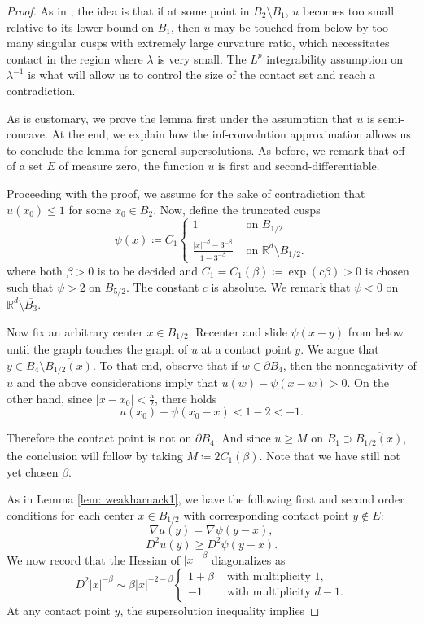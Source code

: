 \documentclass[reqno]{amsart}
\numberwithin{equation}{section}
\numberwithin{equation}{section}
\newcommand{\R}{\mathbb R}
\newcommand{\ds}{\displaystyle}
\newcounter{case}
\begin{document}
\begin{proof}
As in \cite{ArmstrongSmart2014}, the idea is that if at some point in $B_2\setminus B_1$, $u$ becomes too small relative to its lower bound on $B_1$, then $u$ may be touched from below by too many singular cusps with extremely large curvature ratio, which necessitates contact in the region where $\lambda$ is very small. The $L^p$ integrability assumption on $\lambda^{-1}$ is what will allow us to control the size of the contact set and reach a contradiction.

As is customary, we prove the lemma first under the assumption that $u$ is semi-concave. At the end, we explain how the inf-convolution approximation allows us to conclude the lemma for general supersolutions. As before, we remark that off of a set $E$ of measure zero, the function $u$ is first and second-differentiable.

Proceeding with the proof, we assume for the sake of contradiction that $u(x_0) \le 1$ for some $x_0 \in B_2$. Now, define the truncated cusps
$$\psi(x) \coloneqq C_1\begin{cases} 1 & \text{ on } B_{1/2} \\ \frac{|x|^{-\beta} - 3^{-\beta}}{1-3^{-\beta}} & \text{ on } \R^d \setminus B_{1/2}.
    \end{cases}
$$
where both $\beta>0$ is to be decided and $C_1 = C_1(\beta) \coloneqq \exp(c\beta)>0$ is chosen such that $\psi>2$ on $B_{5/2}$. The constant $c$ is absolute. We remark that $\psi<0$ on $\R^d \setminus \overline{B_3}$. 

Now fix an arbitrary center $x \in B_{1/2}$. Recenter and slide $\psi(x-y)$ from below until the graph touches the graph of $u$ at a contact point $y$. We argue that $y \in B_4 \setminus \overline{B_{1/2}(x)}.$  To that end, observe that if $w \in \partial B_4$, then the nonnegativity of $u$ and the above considerations imply that $u(w) - \psi(x-w)>0$. On the other hand, since $|x-x_0|<\ds \frac52$, there holds
$$u(x_0) - \psi(x_0-x) < 1-2<-1.$$

Therefore the contact point is not on $\partial B_4$. And since $u\ge M$ on $\overline{B_1} \supset  \overline{B_{1/2}(x)}$, the conclusion will follow by taking $M \coloneqq 2C_1(\beta)$. Note that we have still not yet chosen $\beta$. 

As in Lemma \ref{lem: weakharnack1}, we have the following first and second order conditions for each center $x\in B_{1/2}$ with corresponding contact point $y\notin E$:
\begin{equation}
\label{eq: FOC3}
\nabla u(y) = \nabla \psi(y-x),
\end{equation}
\begin{equation}
\label{eq: FOC4}
D^2u(y) \ge D^2 \psi(y-x).
\end{equation}
We now record that the Hessian of $|x|^{-\beta}$ diagonalizes as 
$$D^2|x|^{-\beta} \sim \beta |x|^{-2-\beta}\begin{cases} 1+ \beta & \text{ with multiplicity } 1,\\ -1 & \text{ with multiplicity } d-1.\end{cases}$$
At any contact point $y$, the supersolution inequality implies 


\end{proof}
\end{document}
